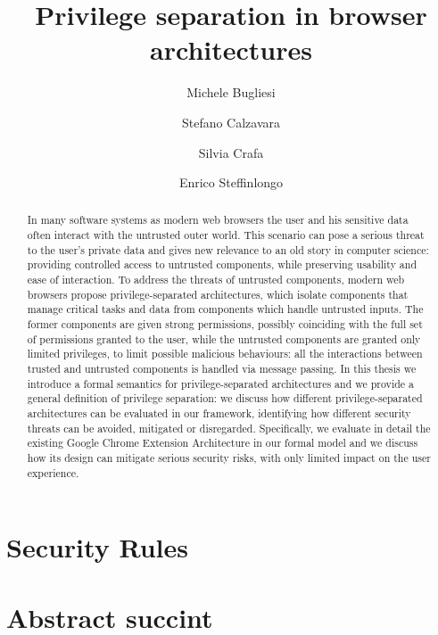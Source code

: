 \documentclass[[12pt,a4paper,twoside,openrigh]{report}
\author{Michele Bugliesi \and Stefano Calzavara \and Silvia Crafa \and Enrico Steffinlongo}
\title{Privilege separation in browser architectures}
\begin{document}
\maketitle
\tableofcontents

\begin{abstract}
In many software systems as modern web browsers the user and his sensitive data often interact with the untrusted outer world. This scenario can pose a serious threat to the user's private data and gives new relevance to an old story in computer science: providing controlled access to untrusted components, while preserving usability and ease of interaction. To address the threats of untrusted components, modern web browsers propose privilege-separated architectures, which isolate components that manage critical tasks and data from components which handle untrusted inputs. The former components are given strong permissions, possibly coinciding with the full set of permissions granted to the user, while the untrusted components are granted only limited privileges, to limit possible malicious behaviours: all the interactions between trusted and untrusted components is handled via message passing. In this thesis we introduce a formal semantics for privilege-separated architectures and we provide a general definition of privilege separation: we discuss how different privilege-separated architectures can be evaluated in our framework, identifying how different security threats can be avoided, mitigated or disregarded. Specifically, we evaluate in detail the existing Google Chrome Extension Architecture in our formal model and we discuss how its design can mitigate serious security risks, with only limited impact on the user experience. 
\end{abstract}

\section{Security Rules}
\section{Abstract succint}
\end{document}
